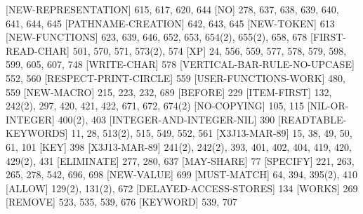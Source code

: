 [NEW-REPRESENTATION] {\footnotesize 615, 617, 620, 644}
[NO] {\footnotesize 278, 637, 638, 639, 640, 641, 644, 645}
[PATHNAME-CREATION] {\footnotesize 642, 643, 645}
[NEW-TOKEN] {\footnotesize 613}
[NEW-FUNCTIONS] {\footnotesize 623, 639, 646, 652, 653, 654(2), 655(2), 658, 678}
[FIRST-READ-CHAR] {\footnotesize 501, 570, 571, 573(2), 574}
[XP] {\footnotesize 24, 556, 559, 577, 578, 579, 598, 599, 605, 607, 748}
[WRITE-CHAR] {\footnotesize 578}
[VERTICAL-BAR-RULE-NO-UPCASE] {\footnotesize 552, 560}
[RESPECT-PRINT-CIRCLE] {\footnotesize 559}
[USER-FUNCTIONS-WORK] {\footnotesize 480, 559}
[NEW-MACRO] {\footnotesize 215, 223, 232, 689}
[BEFORE] {\footnotesize 229}
[ITEM-FIRST] {\footnotesize 132, 242(2), 297, 420, 421, 422, 671, 672, 674(2)}
[NO-COPYING] {\footnotesize 105, 115}
[NIL-OR-INTEGER] {\footnotesize 400(2), 403}
[INTEGER-AND-INTEGER-NIL] {\footnotesize 390}
[READTABLE-KEYWORDS] {\footnotesize 11, 28, 513(2), 515, 549, 552, 561}
[X3J13-MAR-89] {\footnotesize 15, 38, 49, 50, 61, 101}
[KEY] {\footnotesize 398}
[X3J13-MAR-89] {\footnotesize 241(2), 242(2), 393, 401, 402, 404, 419, 
            420, 429(2), 431}
[ELIMINATE] {\footnotesize 277, 280, 637}
[MAY-SHARE] {\footnotesize 77}
[SPECIFY] {\footnotesize 221, 263, 265, 278, 542, 696, 698}
[NEW-VALUE] {\footnotesize 699}
[MUST-MATCH] {\footnotesize 64, 394, 395(2), 410}
[ALLOW] {\footnotesize 129(2), 131(2), 672}
[DELAYED-ACCESS-STORES] {\footnotesize 134}
[WORKS] {\footnotesize 269}
[REMOVE] {\footnotesize 523, 535, 539, 676}
[KEYWORD] {\footnotesize 539, 707}
